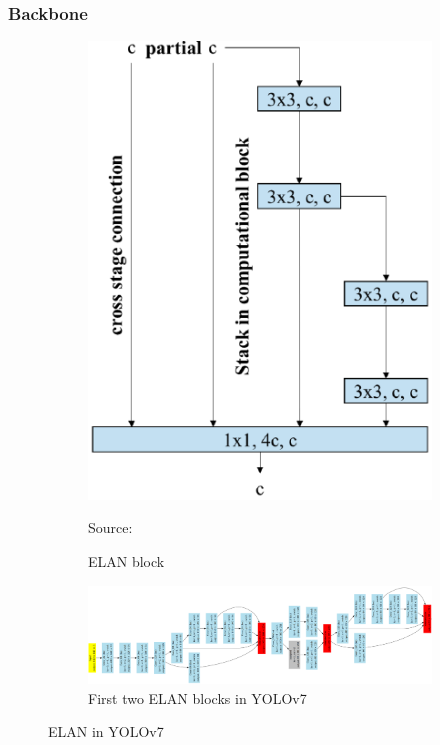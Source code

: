   \subsubsection{Backbone}

  \begin{figure}[H]
    \centering
    \begin{subfigure}[c][][c]{.9\textwidth}
        \centering
        \includegraphics[width=.35\linewidth]{figures/elan-block.png}
        \caption*{Source: \textcite{yolov7}}
        \caption{ELAN block}
        \label{fig:elan-block}
    \end{subfigure}

    \begin{subfigure}[c][][c]{.9\textwidth}
        \includegraphics[width=1\linewidth]{figures/yolo-elan-blocks.png}
        \caption{First two ELAN blocks in YOLOv7}
        \label{fig:elan-yolo}
    \end{subfigure}
    \caption{ELAN in YOLOv7}
    \label{fig:elan}
  \end{figure}

